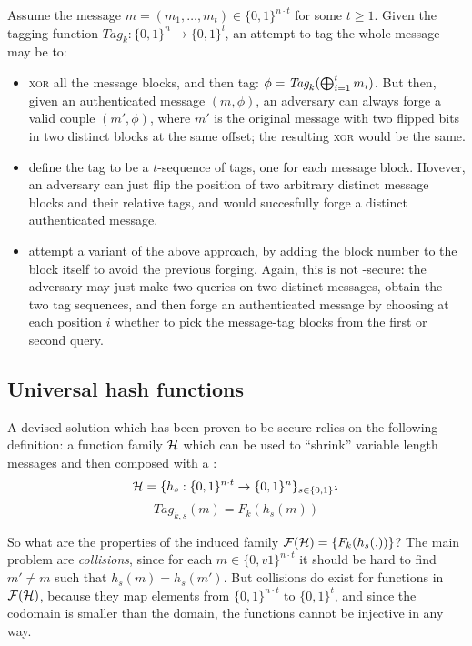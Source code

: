 Assume the message $m = (m_1, \dots, m_t) \in \{0,1\}^{n\cdot t}$ for some $t \geq 1$. Given the tagging function $\textit{Tag}_{k} : \{0, 1\}^n \to \{0, 1\}^l$, an attempt to tag the whole message may be to:

\begin{itemize}    
    \item \textsc{xor} all the message blocks, and then tag: $\phi = \textit{Tag}_k(\bigoplus_{i=1}^{t} m_i)$. But then, given an authenticated message $(m, \phi)$, an adversary can always forge a valid couple $(m', \phi)$, where $m'$ is the original message with two flipped bits in two distinct blocks at the same offset; the resulting \textsc{xor} would be the same.

    \item define the tag to be a $t$-sequence of tags, one for each message block. Hovever, an adversary can just flip the position of two arbitrary distinct message blocks and their relative tags, and would succesfully forge a distinct authenticated message.

    \item attempt a variant of the above approach, by adding the block number to the block itself to avoid the previous forging. Again, this is not \ufcma-secure: the adversary may just make two queries on two distinct messages, obtain the two tag sequences, and then forge an authenticated message by choosing at each position $i$ whether to pick the message-tag blocks from the first or second query.

\end{itemize}

\subsection{Universal hash functions}

A devised solution which has been proven to be secure relies on the following definition: a function family $\mathcal{H}$ which can be used to ``shrink'' variable length messages and then composed with a \prf{}:
\[
   \mathcal{H} = \{h_s : \{0, 1\}^{n\cdot t} \to \{0, 1\}^n \}_{s \in \{0, 1\}^\lambda}
\]
\[
   \textit{Tag}_{k, s}(m) = F_k(h_s(m))
\]

So what are the properties of the induced family $\mathcal{F}(\mathcal{H}) = \{F_{k}(h_{s}(.))\}$? The main problem are \emph{collisions}, since for each $m \in \{0,v1\}^{n\cdot t}$ it should be hard to find $m' \neq m$ such that $h_s(m) = h_s(m')$. But collisions do exist for functions in $\mathcal{F}(\mathcal{H})$, because they map elements from $\{0, 1\}^{n\cdot t} $ to $\{0,1\}^t$, and since the codomain is smaller than the domain, the functions cannot be injective in any way.

